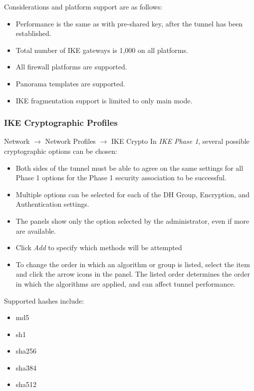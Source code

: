 Considerations and platform support are as follows:
\begin{itemize}
    \item Performance is the same as with pre-shared key, after the tunnel has been established.
    \item Total number of IKE gateways is 1,000 on all platforms.
    \item All firewall platforms are supported.
    \item Panorama templates are supported.
    \item IKE fragmentation support is limited to only main mode.
\end{itemize}

\subsubsection{IKE Cryptographic Profiles}
Network $\rightarrow$ Network Profiles $\rightarrow$ IKE Crypto
\newline
In \textit{IKE Phase 1}, several possible cryptographic options can be chosen:
\begin{itemize}
    \item Both sides of the tunnel must be able to agree on the same settings for all Phase 1 options for the Phase 1 security association to be successful.
    \item Multiple options can be selected for each of the DH Group, Encryption, and Authentication settings.
    \item The panels show only the option selected by the administrator, even if more are available.
    \item Click \textit{Add} to specify which methods will be attempted
    \item To change the order in which an algorithm or group is listed, select the item and click the arrow icons in the panel.
    The listed order determines the order in which the algorithms are applied, and can affect tunnel performance.
\end{itemize}
Supported hashes include:
\begin{itemize}
    \item md5
    \item sh1
    \item sha256
    \item sha384
    \item sha512
\end{itemize}

